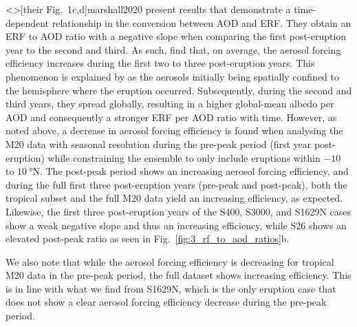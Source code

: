 \documentclass[draft]{agujournal2019}
\begin{document}
  \citeA<>[their Fig.\ 1c,d]{marshall2020} present results that demonstrate a
  time-dependent relationship in the conversion between AOD and ERF. They obtain an ERF
  to AOD ratio with a negative slope when comparing the first post-eruption year to the
  second and third. As such,  find that, on average, the aerosol
  forcing efficiency increases during the first two to three post-eruption years. This
  phenomenon is explained by  as the aerosols initially being
  spatially confined to the hemisphere where the eruption occurred. Subsequently, during
  the second and third years, they spread globally, resulting in a higher global-mean
  albedo per AOD and consequently a stronger ERF per AOD ratio with time. However, as
  noted above, a decrease in aerosol forcing efficiency is found when analysing the M20
  data with seasonal resolution during the pre-peak period (first year post-eruption)
  while constraining the ensemble to only include eruptions within \(-10\) to
  \(\SI{10}{\degree\mathrm{N}}\).  The post-peak period shows an
  increasing aerosol forcing efficiency, and during the full first three post-eruption
  years (pre-peak and post-peak), both the tropical subset and the full M20 data yield
  an increasing efficiency, as expected. Likewise, the first three post-eruption years
  of the S400, S3000, and S1629N cases show a weak negative slope and thus an increasing
  efficiency, while S26 shows an elevated post-peak ratio as seen in
  Fig.~\ref{fig:3_rf_to_aod_ratios}b.

  We also note that while the aerosol forcing efficiency is decreasing for tropical M20
  data in the pre-peak period, the full dataset shows increasing efficiency. This is in
  line with what we find from S1629N, which is the only eruption case that does not show
  a clear aerosol forcing efficiency decrease during the pre-peak period.
\end{document}
